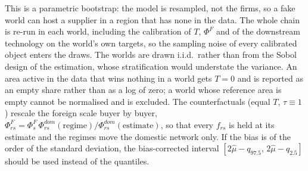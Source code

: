 This is a parametric bootstrap: the model is resampled, not the firms, so a fake world can host a supplier in a region that has none in the data. The whole chain is re-run in each world, including the calibration of $T$, $\Phi^F$ and of the downstream technology on the world's own targets, so the sampling noise of every calibrated object enters the draws. The worlds are drawn i.i.d.\ rather than from the Sobol design of the estimation, whose stratification would understate the variance. An area active in the data that wins nothing in a world gets $T=0$ and is reported as an empty share rather than as a log of zero; a world whose reference area is empty cannot be normalised and is excluded. The counterfactuals (equal $T$, $\tau\equiv1$) rescale the foreign scale buyer by buyer, $\Phi^F_{rs}=\Phi^F_s\,\Phi^{dom}_{rs}(\text{regime})/\Phi^{dom}_{rs}(\text{estimate})$, so that every $f_{rs}$ is held at its estimate and the regimes move the domestic network only. If the bias is of the order of the standard deviation, the bias-corrected interval $[2\hat\mu-q_{97.5},\,2\hat\mu-q_{2.5}]$ should be used instead of the quantiles.

